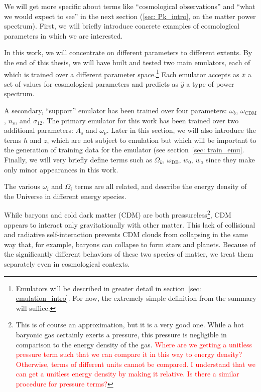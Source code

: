 We will get more specific about terms like ``cosmological observations''
and ``what we would expect to see'' in the next section (\ref{sec: Pk_intro}, 
on the matter power spectrum). First, we will briefly introduce concrete
examples of cosmological parameters in which we are interested.

In this work, we will concentrate on different parameters to different 
extents. By the end of this thesis, we will have built and tested two main
emulators, each of which is trained over a different parameter
space.\footnote{Emulators will be described in greater detail in
section~\ref{sec: emulation_intro}. For now, the extremely simple definition 
from the summary will suffice.}
Each emulator accepts as $x$ a set of values for cosmological parameters and
predicts as $\hat{y}$ a type of power spectrum. 

A secondary, ``support'' emulator has been trained over four parameters:
$\omega_b$, $\omega_\text{CDM}$, $n_s$, and $\sigma_{12}$.
The primary emulator for this work has been trained over two additional
parameters: $A_s$ and $\omega_\nu$. Later in this section, we will also 
introduce the terms $h$ and $z$, which are not subject to emulation but which 
will be important to the generation of training data for the emulator (see 
section~\ref{sec: train_emu}. Finally, we will very briefly define terms such 
as $\Omega_k$, $\omega_\text{DE}$, $w_0$, $w_a$ since they make only minor 
appearances in this work.

The various $\omega_i$ and $\Omega_i$ terms are all related, and describe the
energy density of the Universe in different energy species.

While baryons and cold dark matter (CDM) are both pressureless\footnote{This 
is of
course an approximation, but it is a very good one. While a hot baryonic gas 
certainly exerts a pressure, this pressure is negligible in comparison to the energy density of the gas. \textcolor{red}{Where are we getting a unitless
pressure term such that we can compare it in this way to energy density?
Otherwise, terms of different units cannot be compared. I understand that we
can get a unitless energy density by making it relative. Is there a similar
procedure for pressure terms?}}, CDM appears to interact only gravitationally
with other matter. This lack of collisional and radiative self-interaction
prevents CDM clouds from collapsing in the same way that, for example,
baryons can collapse to form stars and planets. Because of the significantly
different behaviors of these two species of matter, we treat them separately
even in cosmological contexts.

